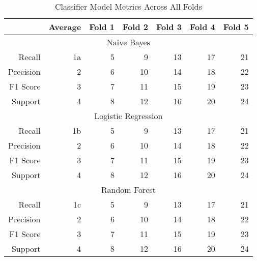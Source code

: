 \begin{table}[h]
    \centering
    \begin{tabular}{r|r|r|r|r|r|r}
        & Average & Fold 1 & Fold 2 & Fold 3 & Fold 4 & Fold 5 \\\hline
        \multicolumn{7}{c}{Naive Bayes} \\\hline
        Recall      & 1a & 5 & 9 & 13 & 17 & 21 \\
        Precision   & 2 & 6 & 10 & 14 & 18 & 22 \\
        F1 Score    & 3 & 7 & 11 & 15 & 19 & 23 \\
        Support     & 4 & 8 & 12 & 16 & 20 & 24 \\\hline
        \multicolumn{7}{c}{Logistic Regression} \\\hline
        Recall      & 1b & 5 & 9 & 13 & 17 & 21 \\
        Precision   & 2 & 6 & 10 & 14 & 18 & 22 \\
        F1 Score    & 3 & 7 & 11 & 15 & 19 & 23 \\
        Support     & 4 & 8 & 12 & 16 & 20 & 24 \\\hline
        \multicolumn{7}{c}{Random Forest} \\\hline
        Recall      & 1c & 5 & 9 & 13 & 17 & 21 \\
        Precision   & 2 & 6 & 10 & 14 & 18 & 22 \\
        F1 Score    & 3 & 7 & 11 & 15 & 19 & 23 \\
        Support     & 4 & 8 & 12 & 16 & 20 & 24 \\\hline
    \end{tabular}
    \caption{Classifier Model Metrics Across All Folds}
    \label{tab:combined_model_metrics_folds}
\end{table}
